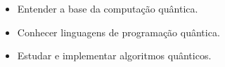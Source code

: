 \begin{itemize}
    \item Entender a base da computação quântica.
    \item Conhecer linguagens de programação quântica.
    \item Estudar e implementar algoritmos quânticos.
\end{itemize}